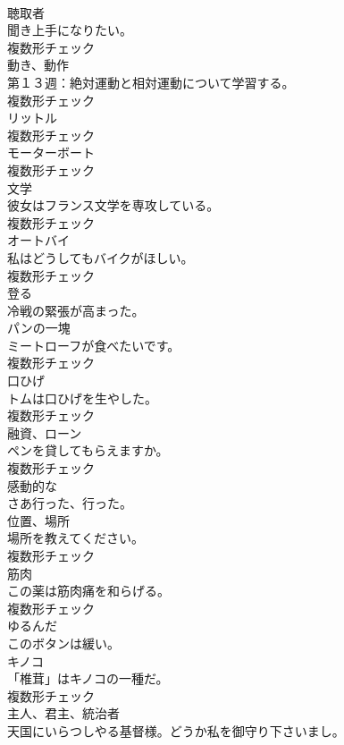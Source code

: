 \documentclass[8pt]{extreport}
\begin{document}
\begin{CJK}{UTF8}{min}
\\	[名詞]	聴取者	
\\	聞き上手になりたい。	
\\	複数形チェック
\\	[名詞]	動き、動作	
\\	第１３週：絶対運動と相対運動について学習する。	
\\	複数形チェック
\\	[名詞]	リットル	
\\	複数形チェック
\\	[名詞]	モーターボート	
\\	複数形チェック
\\	[名詞]	文学	
\\	彼女はフランス文学を専攻している。	
\\	複数形チェック
\\	[名詞]	オートバイ	
\\	私はどうしてもバイクがほしい。	
\\	複数形チェック
\\	[動詞]	登る	
\\	冷戦の緊張が高まった。	
\\	[名詞]	パンの一塊	
\\	ミートローフが食べたいです。	
\\	複数形チェック
\\	[名詞]	口ひげ	
\\	トムは口ひげを生やした。	
\\	複数形チェック
\\	[名詞]	融資、ローン	
\\	ペンを貸してもらえますか。	
\\	複数形チェック
\\	[形容詞]	感動的な	
\\	さあ行った、行った。	
\\	[名詞]	位置、場所	
\\	場所を教えてください。	
\\	複数形チェック
\\	[名詞]	筋肉	
\\	この薬は筋肉痛を和らげる。	
\\	複数形チェック
\\	[形容詞]	ゆるんだ	
\\	このボタンは緩い。	
\\	[名詞]	キノコ	
\\	「椎茸」はキノコの一種だ。	
\\	複数形チェック
\\	[名詞]	主人、君主、統治者	
\\	天国にいらつしやる基督様。どうか私を御守り下さいまし。	

\end{CJK}
\end{document}
